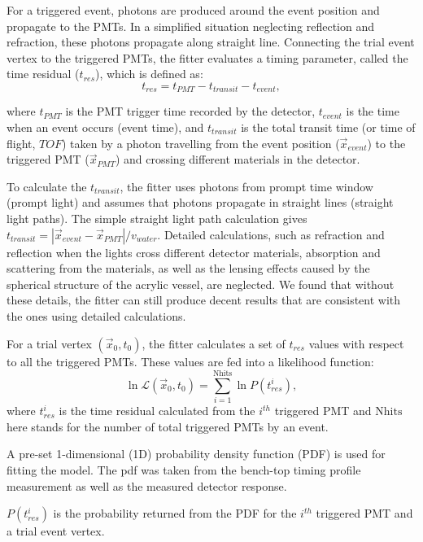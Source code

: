 For a triggered event, photons are produced around the event position and propagate to the PMTs.
In a simplified situation neglecting reflection and refraction, these photons propagate along straight line. Connecting the trial event vertex to the triggered PMTs, the fitter evaluates a timing parameter, called the time residual ($t_{res}$), which is defined as:
\begin{equation}
\label{tres_define}
t_{res}=t_{PMT} - t_{transit} - t_{event},
\end{equation}

where $t_{PMT}$ is the PMT trigger time recorded by the detector, $t_{event}$ is the time when an event occurs (event time), and $t_{transit}$ is the total transit time (or time of flight, $TOF$) taken by a photon travelling from the event position ($\vec{x}_{event}$) to the triggered PMT ($\vec{x}_{PMT}$) and crossing different materials in the detector.

To calculate the $t_{transit}$, the fitter uses photons from prompt time window (prompt light) and assumes that photons propagate in straight lines (straight light paths). The simple straight light path calculation gives $t_{transit}=|\vec{x}_{event}-\vec{x}_{PMT}|/v_{water}$. Detailed calculations, such as refraction and reflection when the lights cross different detector materials, absorption and scattering from the materials, as well as the lensing effects caused by the spherical structure of the acrylic vessel, are neglected. We found that without these details, the fitter can still produce decent results that are consistent with the ones using detailed calculations. 

For a trial vertex $(\vec{x}_0,t_0)$, the fitter calculates a set of $t_{res}$ values with respect to all the triggered PMTs. These values are fed into a likelihood function: 
\begin{equation}
\ln\mathcal{L}(\vec{x}_0,t_0)=\sum_{i=1}^{{\mathrm{Nhits}}}\ln P(t^i_{res}),
\end{equation}
where $t^i_{res}$ is the time residual calculated from the $i^{th}$ triggered PMT and $\mathrm{Nhits}$ here stands for the number of total triggered PMTs by an event.

A pre-set 1-dimensional (1D) probability density function (PDF) is used for fitting the model. The pdf was taken from the bench-top timing profile measurement as well as the measured detector response.

$P(t^i_{res})$ is the probability returned from the PDF for the $i^{th}$ triggered PMT and a trial event vertex.

